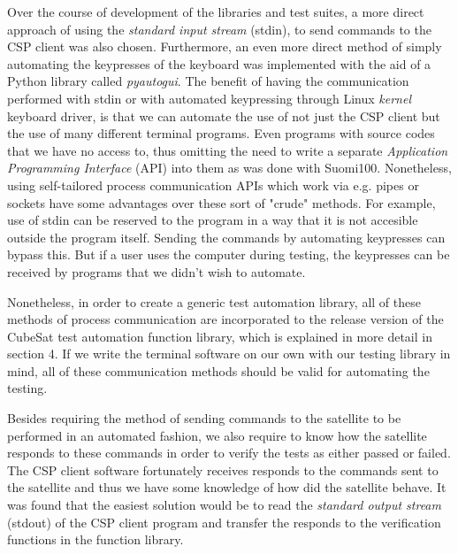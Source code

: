 \documentclass[english,12pt,a4paper,pdftex,elec,utf8]{aaltothesis}
\begin{document}
Over the course of development of the libraries and test suites, a more direct approach of using the \textit{standard input stream} (stdin), to send commands to the CSP client was also chosen. Furthermore, an even more direct method of simply automating the keypresses of the keyboard was implemented with the aid of a Python library called \textit{pyautogui}. The benefit of having the communication performed with stdin or with automated keypressing through Linux \textit{kernel} keyboard driver, is that we can automate the use of not just the CSP client but the use of many different terminal programs. Even programs with source codes that we have no access to, thus omitting the need to write a separate \textit{Application Programming Interface} (API) into them as was done with Suomi100. Nonetheless, using self-tailored process communication APIs which work via e.g. pipes or sockets have some advantages over these sort of "crude" methods. For example, use of stdin can be reserved to the program in a way that it is not accesible outside the program itself. Sending the commands by automating keypresses can bypass this. But if a user uses the computer during testing, the keypresses can be received by programs that we didn't wish to automate.\par
Nonetheless, in order to create a generic test automation library, all of these methods of process communication are incorporated to the release version of the CubeSat test automation function library, which is explained in more detail in section 4.
If we write the terminal software on our own with our testing library in mind, all of these communication methods should be valid for automating the testing.  \par 
Besides requiring the method of sending commands to the satellite to be performed in an automated fashion, we also require to know how the satellite responds to these commands in order to verify the tests as either passed or failed. The CSP client software fortunately receives responds to the commands sent to the satellite and thus we have some knowledge of how did the satellite behave. It was found that the easiest solution would be to read the \textit{standard output stream} (stdout) of the CSP client program and transfer the responds to the verification functions in the function library.\par
\end{document}
